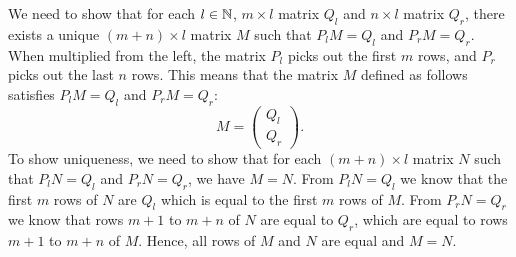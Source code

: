 \begin{solution}
\begin{enumerate}
		We need to show that for each $l \in \mathbb{N}$, $m \times l$ matrix $Q_l$ and $n \times l$ matrix $Q_r$, there exists a unique $(m + n) \times l$ matrix $M$ such that $P_l M = Q_l$ and $P_r M = Q_r$. 
		When multiplied from the left, the matrix $P_l$ picks out the first $m$ rows, and $P_r$ picks out the last $n$ rows. This means that the matrix $M$ defined as follows satisfies $P_l M = Q_l$ and $P_r M = Q_r$:
		\[
		M = 
		\begin{pmatrix}
			Q_l \\
			Q_r
		\end{pmatrix}.
		\]
		To show uniqueness, we need to show that for each $(m+n) \times l$ matrix $N$ such that $P_l N = Q_l$ and $P_r N = Q_r$, we have $M=N$.
		From $P_l N = Q_l$ we know that the first $m$ rows of $N$ are $Q_l$ which is equal to the first $m$ rows of $M$. From $P_r N = Q_r$ we know that rows $m+1$ to $m+n$ of $N$ are equal to $Q_r$, which are equal to rows $m+1$ to $m+n$ of $M$. Hence, all rows of $M$ and $N$ are equal and $M =N$.
	\end{enumerate}
\end{solution}

